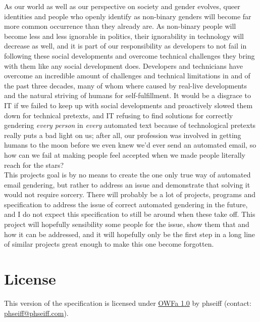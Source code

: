 \documentclass{article}
\begin{document}
    As our world as well as our perspective on society and gender evolves, queer identities and people who openly identify as non-binary genders will become far more common occurrence than they already are.
    As non-binary people will become less and less ignorable in politics, their ignorability in technology will decrease as well, and it is part of our responsibility as developers to not fail in following these social developments and overcome technical challenges they bring with them like any social development does.
    Developers and technicians have overcome an incredible amount of challenges and technical limitations in and of the past three decades, many of whom where caused by real-live developments and the natural striving of humans for self-fulfillment.
    It would be a disgrace to IT if we failed to keep up with social developments and proactively slowed them down for technical pretexts, and IT refusing to find solutions for correctly gendering \emph{every person} in \emph{every} automated text because of technological pretexts really puts a bad light on us;
    after all, our profession was involved in getting humans to the moon before we even knew we'd ever send an automated email, so how can we fail at making people feel accepted when we made people literally reach for the stars? \\

    This projects goal is by no means to create the one only true way of automated email gendering, but rather to address an issue and demonstrate that solving it would not require sorcery.
    There will probably be a lot of projects, programs and specification to address the issue of correct automated gendering in the future, and I do not expect this specification to still be around when these take off.
    This project will hopefully sensibility some people for the issue, show them that and how it can be addressed, and it will hopefully only be the first step in a long line of similar projects great enough to make this one become forgotten.\\

\section{License}

    This version of the specification is licensed under \href{http://www.openwebfoundation.org/legal/the-owf-1-0-agreements/owfa-1-0}{OWFa 1.0} by phseiff (contact: \href{mailto:phseiff@phseiff.com}{phseiff@phseiff.com}).
\end{document}
